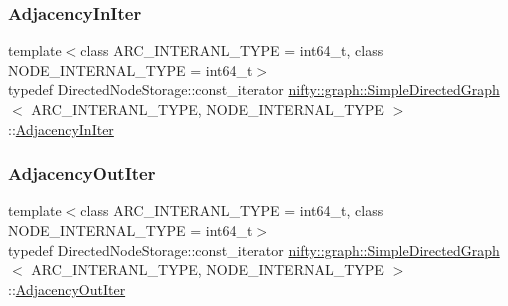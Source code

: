 \subsubsection{\texorpdfstring{Adjacency\+In\+Iter}{AdjacencyInIter}}
{\footnotesize\ttfamily template$<$class A\+R\+C\+\_\+\+I\+N\+T\+E\+R\+A\+N\+L\+\_\+\+T\+Y\+PE  = int64\+\_\+t, class N\+O\+D\+E\+\_\+\+I\+N\+T\+E\+R\+N\+A\+L\+\_\+\+T\+Y\+PE  = int64\+\_\+t$>$ \\
typedef Directed\+Node\+Storage\+::const\+\_\+iterator \hyperlink{classnifty_1_1graph_1_1SimpleDirectedGraph}{nifty\+::graph\+::\+Simple\+Directed\+Graph}$<$ A\+R\+C\+\_\+\+I\+N\+T\+E\+R\+A\+N\+L\+\_\+\+T\+Y\+PE, N\+O\+D\+E\+\_\+\+I\+N\+T\+E\+R\+N\+A\+L\+\_\+\+T\+Y\+PE $>$\+::\hyperlink{classnifty_1_1graph_1_1SimpleDirectedGraph_aaf7f58391a2b6e0db7983462dbd6a542}{Adjacency\+In\+Iter}}

\mbox{\label{classnifty_1_1graph_1_1SimpleDirectedGraph_a5af7a4eb6bbc44b805a44bb131786dd0}} 
\subsubsection{\texorpdfstring{Adjacency\+Out\+Iter}{AdjacencyOutIter}}
{\footnotesize\ttfamily template$<$class A\+R\+C\+\_\+\+I\+N\+T\+E\+R\+A\+N\+L\+\_\+\+T\+Y\+PE  = int64\+\_\+t, class N\+O\+D\+E\+\_\+\+I\+N\+T\+E\+R\+N\+A\+L\+\_\+\+T\+Y\+PE  = int64\+\_\+t$>$ \\
typedef Directed\+Node\+Storage\+::const\+\_\+iterator \hyperlink{classnifty_1_1graph_1_1SimpleDirectedGraph}{nifty\+::graph\+::\+Simple\+Directed\+Graph}$<$ A\+R\+C\+\_\+\+I\+N\+T\+E\+R\+A\+N\+L\+\_\+\+T\+Y\+PE, N\+O\+D\+E\+\_\+\+I\+N\+T\+E\+R\+N\+A\+L\+\_\+\+T\+Y\+PE $>$\+::\hyperlink{classnifty_1_1graph_1_1SimpleDirectedGraph_a5af7a4eb6bbc44b805a44bb131786dd0}{Adjacency\+Out\+Iter}}

\mbox{\label{classnifty_1_1graph_1_1SimpleDirectedGraph_a0e61985b1487d018ab09fcefb2302c99}} 
